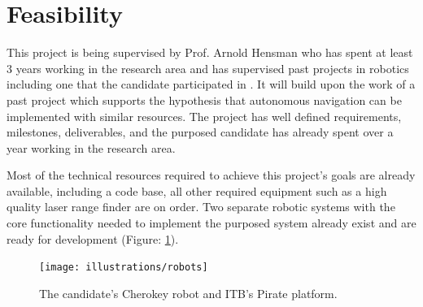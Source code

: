 \newpage


\section{Feasibility}
\noindent
This project is being supervised by Prof. Arnold Hensman who has spent at least 3 years working in the research area and has supervised past projects in robotics including one that the candidate participated in \cite{JMD14}. It will build upon the work of a past project \cite{JMD14} which supports the hypothesis that autonomous navigation can be implemented with similar resources. The project has well defined requirements, milestones, deliverables, and the purposed candidate has already spent over a year working in the research area. \newline

\noindent
Most of the technical resources required to achieve this project's goals are already available, including a code base, all other required equipment such as a high quality laser range finder are on order. Two separate robotic systems with the core functionality needed to implement the purposed system already exist and are ready for development (Figure: \ref{Figure: Robot Platforms.}). 
\newline

\begin{figure}[htbp]

\center \texttt{[image: illustrations/robots]}\\
\caption{The candidate's Cherokey robot and ITB's Pirate platform.} 
\label{Figure: Robot Platforms.}

\end{figure}
